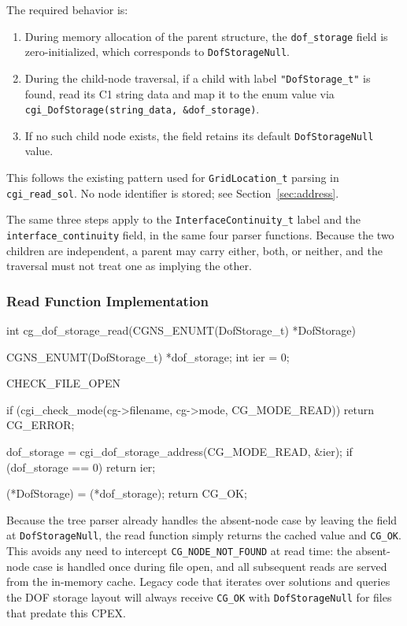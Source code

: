 \documentclass[11pt,letterpaper]{article}
\makeatletter
\let\cgns@orig@lstlisting\lstlisting
\let\cgns@endorig@lstlisting\endlstlisting
\renewenvironment{lstlisting}
  {\par\needspace{5\baselineskip}\nolinenumbers\cgns@orig@lstlisting}
  {\cgns@endorig@lstlisting\par\linenumbers}
\makeatother
\begin{document}
The required behavior is:

\begin{enumerate}[leftmargin=2em]
\item During memory allocation of the parent structure, the
  \texttt{dof\_storage} field is zero-initialized, which corresponds
  to \texttt{DofStorageNull}.
\item During the child-node traversal, if a child with label
  \texttt{"DofStorage\_t"} is found, read its C1 string
  data and map it to the enum value via
  \texttt{cgi\_DofStorage(string\_data, \&dof\_storage)}.
\item If no such child node exists, the field retains its default
  \texttt{DofStorageNull} value.
\end{enumerate}

This follows the existing pattern used for \texttt{GridLocation\_t}
parsing in \texttt{cgi\_read\_sol}.  No node identifier is stored;
see Section~\ref{sec:address}.

The same three steps apply to the \texttt{InterfaceContinuity\_t} label
and the \texttt{interface\_continuity} field, in the same four parser
functions.  Because the two children are independent, a parent may carry
either, both, or neither, and the traversal must not treat one as
implying the other.

\subsubsection{Read Function Implementation}

\begin{lstlisting}[language=C]
int cg_dof_storage_read(CGNS_ENUMT(DofStorage_t) *DofStorage)
{
    CGNS_ENUMT(DofStorage_t) *dof_storage;
    int ier = 0;

    CHECK_FILE_OPEN

    if (cgi_check_mode(cg->filename, cg->mode, CG_MODE_READ))
        return CG_ERROR;

    dof_storage = cgi_dof_storage_address(CG_MODE_READ, &ier);
    if (dof_storage == 0) return ier;

    (*DofStorage) = (*dof_storage);
    return CG_OK;
}
\end{lstlisting}

Because the tree parser already handles the absent-node case by leaving
the field at \texttt{DofStorageNull}, the read function simply returns
the cached value and \texttt{CG\_OK}.  This avoids any need to intercept
\texttt{CG\_NODE\_NOT\_FOUND} at read time: the absent-node case is
handled once during file open, and all subsequent reads are served from
the in-memory cache.  Legacy code that iterates over solutions and
queries the DOF storage layout will always receive \texttt{CG\_OK} with
\texttt{DofStorageNull} for files that predate this CPEX.
\end{document}
